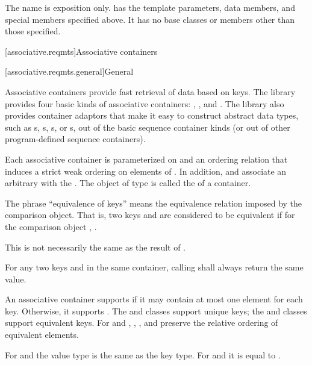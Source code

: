 \pnum
The name  is exposition only.
 has the template parameters,
data members, and special members specified above.
It has no base classes or members other than those specified.

[associative.reqmts]{Associative containers}

[associative.reqmts.general]{General}

\pnum
Associative containers provide fast retrieval of data based on keys.
The library provides four basic kinds of associative containers:
,
,
and
.
The library also provides container adaptors
that make it easy to construct abstract data types,
such as s, s,
s, or s,
out of the basic sequence container kinds
(or out of other program-defined sequence containers).

\pnum
Each associative container is parameterized on
and an ordering relation
that induces a strict weak ordering on
elements of
.
In addition,
and
associate an arbitrary 
with the
.
The object of type
is called the
of a container.

\pnum
The phrase ``equivalence of keys'' means the equivalence relation imposed by the
comparison object.
That is, two keys
and
are considered to be equivalent if for the
comparison object
,
.
\begin{note}
This is not necessarily the same as the result of .
\end{note}
For any two keys
and
in the same container, calling
shall always return the same value.

\pnum
An associative container supports  if it may contain at
most one element for each key. Otherwise, it supports .
The  and  classes support unique keys; the 
and  classes support equivalent keys.
For  and ,
, , and  preserve the relative ordering
of equivalent elements.

\pnum
For  and  the value type is the same as the key type.
For  and  it is equal to .

